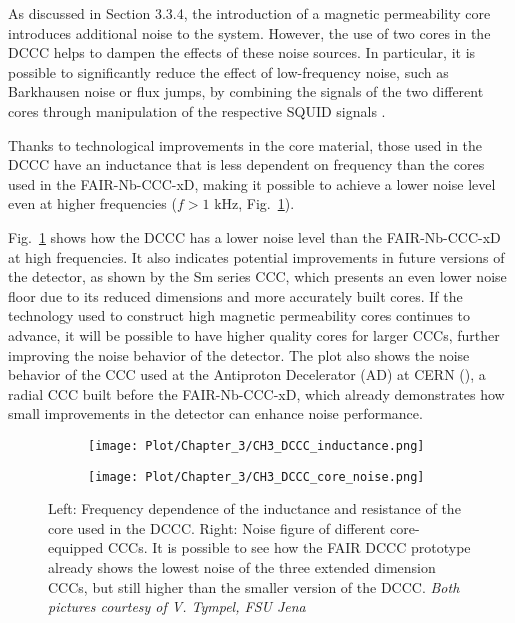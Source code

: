\documentclass[12pt,a4paper]{report}
\begin{document}
       As discussed in Section 3.3.4, the introduction of a magnetic permeability core introduces additional noise to the system. However, the use of two cores in the DCCC helps to dampen the effects of these noise sources. In particular, it is possible to significantly reduce the effect of low-frequency noise, such as Barkhausen noise or flux jumps, by combining the signals of the two different cores through manipulation of the respective SQUID signals \cite{Max_thesis}.
       
       Thanks to technological improvements in the core material, those used in the DCCC have an inductance that is less dependent on frequency than the cores used in the FAIR-Nb-CCC-xD, making it possible to achieve a lower noise level even at higher frequencies \cite{Volker_IEEE} ($f > 1$ kHz, Fig.~\ref{CH3_DCCC_core}).
       
       Fig.~\ref{CH3_DCCC_core} shows how the DCCC has a lower noise level than the FAIR-Nb-CCC-xD at high frequencies. It also indicates potential improvements in future versions of the detector, as shown by the Sm series CCC, which presents an even lower noise floor due to its reduced dimensions and more accurately built cores. If the technology used to construct high magnetic permeability cores continues to advance, it will be possible to have higher quality cores for larger CCCs, further improving the noise behavior of the detector. The plot also shows the noise behavior of the CCC used at the Antiproton Decelerator (AD) at CERN (\cite{CERNCCC_1}\cite{CERNCCC_2}), a radial CCC built before the FAIR-Nb-CCC-xD, which already demonstrates how small improvements in the detector can enhance noise performance.
       
       \begin{figure}[H]
       	\begin{subfigure}[b]{0.54\textwidth}
       		\centering
       		\texttt{[image: Plot/Chapter\_3/CH3\_DCCC\_inductance.png]}
       	\end{subfigure}
       	\hfill
       	\begin{subfigure}[b]{0.55\textwidth}
       		\centering
       		\texttt{[image: Plot/Chapter\_3/CH3\_DCCC\_core\_noise.png]}
       	\end{subfigure}
       	\caption{\small{Left: Frequency dependence of the inductance and resistance of the core used in the DCCC. Right: Noise figure of different core-equipped CCCs. It is possible to see how the FAIR DCCC prototype already shows the lowest noise of the three extended dimension CCCs, but still higher than the smaller version of the DCCC. \textit{Both pictures courtesy of V. Tympel, FSU Jena}}}
       	\label{CH3_DCCC_core}
       \end{figure}
       
\end{document}
